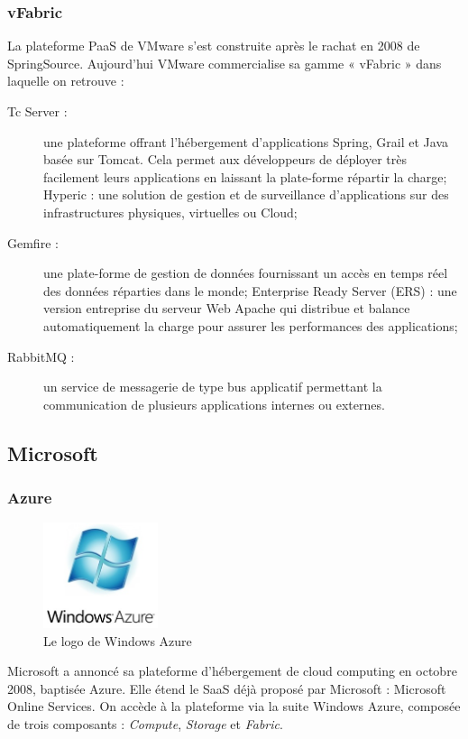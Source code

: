 \documentclass[a4paper,12pt]{report}
\begin{document}
\begin{onehalfspace}
	\subsubsection*{vFabric}
	La plateforme PaaS de VMware s'est construite après le rachat en 2008 de SpringSource. Aujourd'hui VMware commercialise sa gamme « vFabric » dans laquelle on retrouve \cite{source:vfabric} :
	\begin{description}
		\item[Tc Server :] une plateforme offrant l'hébergement d'applications Spring, Grail et Java basée sur Tomcat. Cela permet aux développeurs de déployer très facilement leurs applications en laissant la plate-forme répartir la charge; Hyperic : une solution de gestion et de surveillance d'applications sur des infrastructures physiques, virtuelles ou Cloud;
		\item[Gemfire :] une plate-forme de gestion de données fournissant un accès en temps réel des données réparties dans le monde; Enterprise Ready Server (ERS) : une version entreprise du serveur Web Apache qui distribue et balance automatiquement la charge pour assurer les performances des applications;
		\item[RabbitMQ :] un service de messagerie de type bus applicatif permettant la communication de plusieurs applications internes ou externes.
	\end{description}


	\subsection{Microsoft}

\subsubsection{Azure}
		\begin{figure}
			\centering
			\includegraphics[width=0.3\textwidth]{azure.jpeg} 
			\caption{Le logo de Windows Azure}
		\end{figure}
Microsoft a annoncé sa plateforme d'hébergement de cloud computing en octobre 2008, baptisée Azure. Elle étend le SaaS déjà proposé par Microsoft : Microsoft Online Services. On accède à la plateforme via la suite Windows Azure, composée de trois composants : \textit{Compute}, \textit{Storage} et \textit{Fabric}.


\end{onehalfspace}
\end{document}
